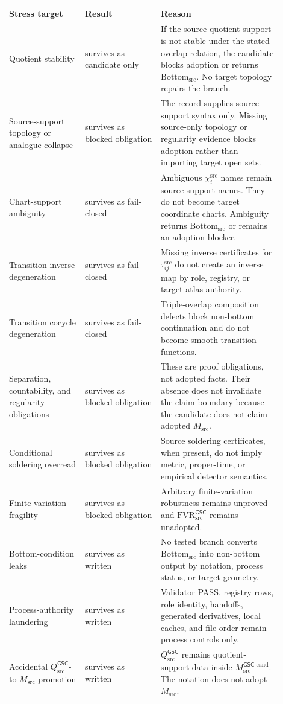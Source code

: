 \documentclass[11pt]{article}
\newcommand{\GSC}{\mathsf{GSC}}
\newcommand{\Msrc}{M_{\mathrm{src}}}
\newcommand{\Qsrc}{Q_{\mathrm{src}}}
\newcommand{\Bottomsrc}{\mathrm{Bottom}_{\mathrm{src}}}
\begin{document}
\begin{longtable}{|p{0.25\linewidth}|p{0.25\linewidth}|p{0.40\linewidth}|}
\hline
\textbf{Stress target} & \textbf{Result} & \textbf{Reason} \\
\hline
Quotient stability & survives as candidate only & If the source quotient
support is not stable under the stated overlap relation, the candidate blocks
adoption or returns \(\Bottomsrc\). No target topology repairs the branch. \\
\hline
Source-support topology or analogue collapse & survives as blocked
obligation & The record supplies source-support syntax only. Missing
source-only topology or regularity evidence blocks adoption rather than
importing target open sets. \\
\hline
Chart-support ambiguity & survives as fail-closed & Ambiguous
\(\chi_i^{\mathrm{src}}\) names remain source support names. They do not
become target coordinate charts. Ambiguity returns \(\Bottomsrc\) or remains
an adoption blocker. \\
\hline
Transition inverse degeneration & survives as fail-closed & Missing inverse
certificates for \(\tau_{ij}^{\mathrm{src}}\) do not create an inverse map by
role, registry, or target-atlas authority. \\
\hline
Transition cocycle degeneration & survives as fail-closed & Triple-overlap
composition defects block non-bottom continuation and do not become smooth
transition functions. \\
\hline
Separation, countability, and regularity obligations & survives as blocked
obligation & These are proof obligations, not adopted facts. Their absence
does not invalidate the claim boundary because the candidate does not claim
adopted \(\Msrc\). \\
\hline
Conditional soldering overread & survives as blocked obligation & Source
soldering certificates, when present, do not imply metric, proper-time, or
empirical detector semantics. \\
\hline
Finite-variation fragility & survives as blocked obligation & Arbitrary
finite-variation robustness remains unproved and
\(\mathrm{FVR}_{\mathrm{src}}^{\GSC}\) remains unadopted. \\
\hline
Bottom-condition leaks & survives as written & No tested branch converts
\(\Bottomsrc\) into non-bottom output by notation, process status, or target
geometry. \\
\hline
Process-authority laundering & survives as written & Validator PASS,
registry rows, role identity, handoffs, generated derivatives, local caches,
and file order remain process controls only. \\
\hline
Accidental \(\Qsrc^{\GSC}\)-to-\(\Msrc\) promotion & survives as written &
\(\Qsrc^{\GSC}\) remains quotient-support data inside
\(\Msrc^{\GSC\mbox{-}\mathrm{cand}}\). The notation does not adopt \(\Msrc\). \\
\hline
\end{longtable}
\end{document}
